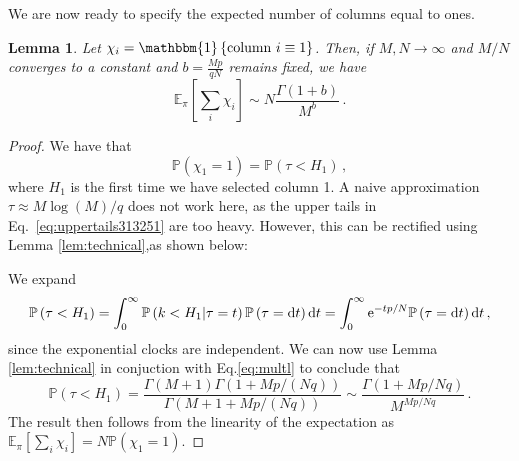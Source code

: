 \documentclass{article}
\numberwithin{equation}{section}
\newcommand{\gk}[1]{\left\{#1\right\}}
\newcommand{\ek}[1]{\left[#1\right]}
\newcommand{\rk}[1]{\left(#1\right)}
\newcommand{\Ocal}   {{\mathcal O }}
\renewcommand{\P}   {\mathbb{P}}
\newcommand{\E}     {\mathbb{E}}
\newcommand{\ex}{{\rm e}}
\renewcommand{\d}{{\rm d}}
\newcommand{\1}{\mathbbm{1}}
\renewcommand{\P}{\mathbb{P}}
\newtheorem{lemma}{Lemma}[section]
\begin{document}
We are now ready to specify the expected number of columns equal to ones.
\begin{lemma}\label{lem:multColDen}
    Let $\chi_i=\1\gk{\textnormal{column }i\equiv 1}$. Then, if $M,N\to\infty$ and $M/N$ converges to a constant and $b=\tfrac{Mp}{qN}$ remains fixed, we have
    \begin{equation}
        \E_\pi\ek{\sum_i \chi_i}\sim  N  \frac{\Gamma(1+b)}{M^{b}}\, .
    \end{equation}
\end{lemma}
\begin{proof}
    We have that
    \begin{equation}
        \P\rk{\chi_1=1}=\P\rk{\tau<H_1}\, ,
    \end{equation}
    where $H_1$ is the first time we have selected column 1. A naive approximation $\tau\approx M\log(M)/q$ does not work here, as the upper tails in Eq.~\eqref{eq:uppertails313251} are too heavy. However, this can be rectified using Lemma \ref{lem:technical},as shown below:

    We expand
        \begin{equation}\label{eq:multl}
        \P\rk{\tau<H_1}=\int_0^\infty \P\rk{k<H_1|\tau= t}\P\rk{\tau=\d t}\d t=\int_0^\infty \ex^{-t p/N}\P\rk{\tau=\d t}\d t\, ,
    \end{equation}
     since the exponential clocks are independent. %
    We can now use Lemma \ref{lem:technical} in conjuction with Eq.\eqref{eq:multl} to conclude that
    \begin{equation}
        \P\rk{\tau<H_1}=\frac{\Gamma\rk{M+1}\Gamma\rk{1+Mp/(Nq)}}{\Gamma\rk{M+1+Mp/(Nq)}}\sim \frac{\Gamma(1+Mp/Nq)}{M^{Mp/Nq}}\, .
    \end{equation}
    The result then follows from the linearity of the expectation as $ \E_\pi\ek{\sum_i \chi_i}=N\P\rk{\chi_1=1}$.
\end{proof}
\end{document}
